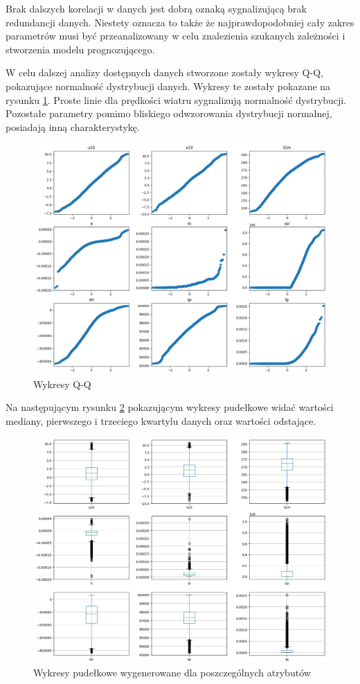 Brak dalszych korelacji w danych jest dobrą oznaką sygnalizującą brak redundancji danych.
Niestety oznacza to także że najprawdopodobniej cały zakres parametrów musi być przeanalizowany
w celu znalezienia szukanych zależności i stworzenia modelu prognozującego. 

W celu dalszej analizy dostępnych danych stworzone zostały wykresy Q-Q, pokazujące normalność
dystrybucji danych. Wykresy te zostały pokazane na rysunku \ref{qq}. Proste linie dla prędkości 
wiatru sygnalizują normalność dystrybucji. Pozostałe parametry pomimo bliskiego odwzorowania
dystrybucji normalnej, posiadają inną charakterystykę. 


\begin{figure}[H]
    \centering
    \includegraphics[width=\textwidth]{images/qq.png}
    \caption{Wykresy Q-Q}
    \label{qq}
\end{figure}

Na następującym rysunku \ref{box} pokazującym wykresy pudełkowe widać wartości mediany, pierwszego i trzeciego
kwartylu danych oraz wartości odstające. 

\begin{figure}[H]
    \centering
    \includegraphics[width=\textwidth]{images/box.png}
    \caption{Wykresy pudełkowe wygenerowane dla poszczególnych atrybutów}
    \label{box}
\end{figure}

